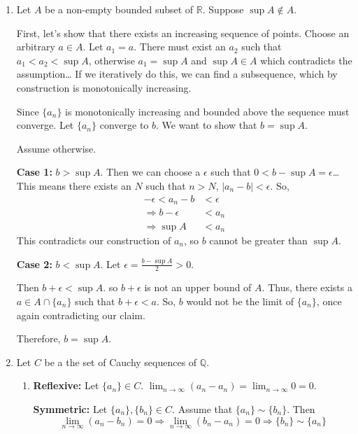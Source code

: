 \documentclass[12pt]{article}
\begin{document}
\begin{enumerate}[start=1,label={\bfseries Problem \arabic*:},leftmargin=1in]
    \item Let $A$ be a non-empty bounded subset of $\mathbb{R}$. Suppose $\sup A \not \in A$. 
    
    First, let's show that there exists an increasing sequence of points. 
    Choose an arbitrary $a \in A$. Let $a_{1} = a$. There must exist an $a_{2}$ such that $a_{1} < a_{2} < \sup A$, otherwise $a_{1} = \sup A$ and $\sup A \in A$ which contradicts the assumption\dots
    If we iteratively do this, we can find a subsequence, which by construction is monotonically increasing. 

    Since $\{ a_{n} \}$ is monotonically increasing and bounded above the sequence must converge.
    Let $\{ a_{n} \}$ converge to $b$. We want to show that $b = \sup A$. 

    Assume otherwise. 

    \textbf{Case 1:} $b > \sup A$. 
    Then we can choose a $\epsilon$ such that $0 < b - \sup A = \epsilon$\dots
    This means there exists an $N$ such that $n > N$, $|a_{n} - b| < \epsilon$. So, 
    \begin{align*}
        -\epsilon < a_{n} -b &< \epsilon \\ 
        \Rightarrow b - \epsilon &< a_{n} \\ 
        \Rightarrow \sup A &< a_{n}
    \end{align*}
    This contradicts our construction of $a_{n}$, so $b$ cannot be greater than $\sup A$. 

    \textbf{Case 2:} $b < \sup A$. Let $\epsilon = \frac{b - \sup A}{2} > 0$. 

    Then $b + \epsilon < \sup A$. so $b+\epsilon$ is not an upper bound of $A$. 
    Thus, there exists a $a \in A \cap \{ a_{n} \}$ such that $b + \epsilon < a$. 
    So, $b$ would not be the limit of $\{ a_{n} \}$, once again contradicting our claim. 

    Therefore, $b = \sup A$. 

    \item Let $C$ be a the set of Cauchy sequences of $\mathbb{Q}$. 
    \begin{enumerate}
        \item \textbf{Reflexive:} Let $\{ a_{n} \} \in C$. $\lim_{n \to \infty} (a_{n} - a_{n}) = \lim_{n \to \infty} 0 = 0$.
        
        \textbf{Symmetric:} Let $\{a_{n} \}, \{ b_{n}\} \in C$. Assume that $\{a_{n} \} \sim \{ b_{n} \}$. 
        Then \[\lim_{n \to \infty} (a_{n} - b_{n}) = 0 \Rightarrow \lim_{n \to \infty} (b_{n}-a_{n}) = 0 \Rightarrow \{b_{n}\} \sim \{a_{n}\}\]
    

\end{enumerate}
\end{enumerate}
\end{document}
